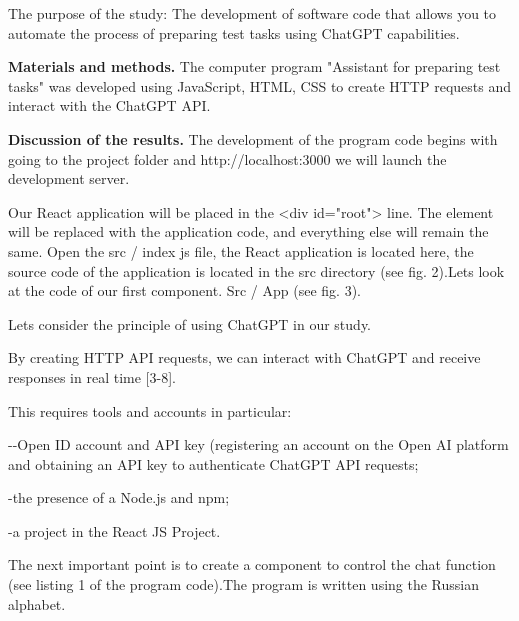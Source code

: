 \begin{multicols}{2}
The purpose of the study: The development of software code that allows
you to automate the process of preparing test tasks using ChatGPT
capabilities.

{\bfseries Materials and methods.} The computer program "Assistant for
preparing test tasks" was developed using JavaScript, HTML, CSS to
create HTTP requests and interact with the ChatGPT API.

{\bfseries Discussion of the results.} The development of the program code
begins with going to the project folder and http://localhost:3000 we
will launch the development server.

Our React application will be placed in the \textless div id="root"\textgreater{} line. 
The element will be replaced with the application code, and everything 
else will remain the same.	Open the src / index js file, the React application is located here, the
source code of the application is located in the src directory (see fig.
2).Let\textquotesingle s look at the code of our first component. Src / App (see fig. 3). 

Let\textquotesingle s consider the principle of using ChatGPT in our
study.

By creating HTTP API requests, we can interact with ChatGPT and receive
responses in real time {[}3-8{]}.

This requires tools and accounts in particular:

-\/-Open ID account and API key (registering an account on the Open AI
platform and obtaining an API key to authenticate ChatGPT API requests;

-the presence of a Node.js and npm;

-a project in the React JS Project.


The next important point is to create a component to control the chat
function (see listing 1 of the program code).The program is written
using the Russian alphabet.
	

\end{multicols}

